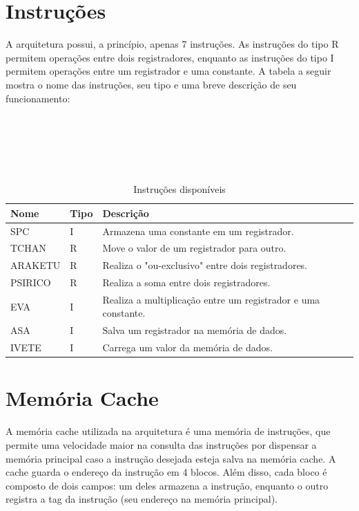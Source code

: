 \documentclass[
	12pt,				%
	oneside,			%
	a4paper,			%
	english,			%
	french,				%
	spanish,			%
	brazil				%
	]{abntex2}
\begin{document}
\section{Instruções}

A arquitetura possui, a princípio, apenas 7 instruções. As instruções do tipo R permitem operações entre dois registradores, enquanto as instruções do tipo I permitem operações entre um registrador e uma constante. A tabela a seguir mostra o nome das instruções, seu tipo e uma breve descrição de seu funcionamento:\\ \\ \\ \\ \\ \\

\begin{table}[htb]
\center
\footnotesize
\begin{tabular}{|p{2cm}|p{2cm}|p{10cm}|}
  \hline
   \textbf{Nome} & \textbf{Tipo}  & \textbf{Descrição} \\
    \hline
    SPC & I & Armazena uma constante em um registrador.\\
    \hline
    TCHAN & R & Move o valor de um registrador para outro.\\
    \hline
    ARAKETU & R & Realiza o "ou-exclusivo" entre dois registradores.\\
    \hline
    PSIRICO & R & Realiza a soma entre dois registradores.\\
    \hline
    EVA & I & Realiza a multiplicação entre um registrador e uma constante.\\
    \hline
    ASA & I & Salva um registrador na memória de dados.\\
    \hline
    IVETE & I & Carrega um valor da memória de dados.\\
    \hline
\end{tabular}
\caption{Instruções disponíveis}
\label{table2:sample}
\end{table}

\section{Memória Cache}

A memória cache utilizada na arquitetura é uma memória de instruções, que permite uma velocidade maior na consulta das instruções por dispensar a memória principal caso a instrução desejada esteja salva na memória cache. A cache guarda o endereço da instrução em 4 blocos. Além disso, cada bloco é composto de dois campos: um deles armazena a instrução, enquanto o outro registra a tag da instrução (seu endereço na memória principal).
\end{document}
